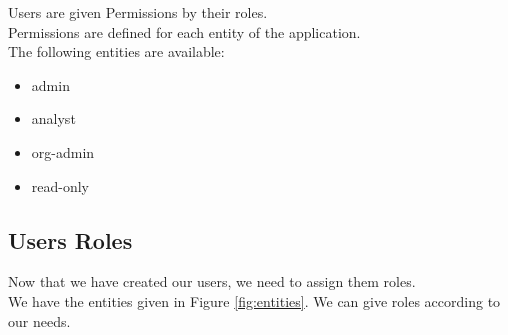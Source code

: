 \documentclass{article}
\begin{document}
Users are given Permissions by their roles. \\
Permissions are defined for each entity of the application.\\
The following entities are available:
\begin{itemize}
    \item admin
    \item analyst
    \item org-admin
    \item read-only
\end{itemize}

\subsection{Users Roles}
Now that we have created our users, we need to assign them roles.\\
We have the entities given in Figure \ref{fig:entities}. We can give roles according to our needs.\\
\end{document}
